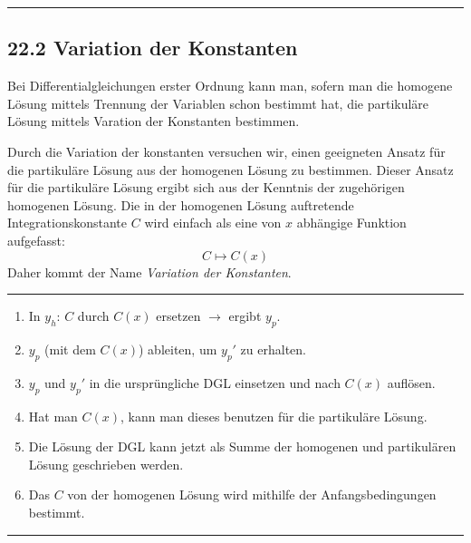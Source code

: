 \documentclass[a4paper,landscape,8pt]{extarticle}
\newcommand{\sep}{\vspace{5pt}\noindent\hrule\vspace{5pt}}
\begin{document}
\begin{multicols*}{4}
\sep

\subsection{22.2 Variation der Konstanten}

Bei Differentialgleichungen erster Ordnung kann man, sofern man die homogene
Lösung mittels Trennung der Variablen schon bestimmt hat, die partikuläre Lösung
mittels Varation der Konstanten bestimmen.

Durch die Variation der konstanten versuchen wir, einen geeigneten Ansatz für
die partikuläre Lösung aus der homogenen Lösung zu bestimmen. Dieser Ansatz für
die partikuläre Lösung ergibt sich aus der Kenntnis der zugehörigen homogenen
Lösung. Die in der homogenen Lösung auftretende Integrationskonstante $C$ wird
einfach als eine von $x$ abhängige Funktion aufgefasst:
\[
C \mapsto C(x)
\]
Daher kommt der Name \emph{Variation der Konstanten}. 

\sep

\Vorgehen 

\begin{enumerate}
  \item In $y_h$: $C$ durch $C(x)$ ersetzen $\to$ ergibt $y_p$.
  \item $y_p$ (mit dem $C(x)$) ableiten, um $y_p'$ zu erhalten.
  \item $y_p$ und $y_p'$ in die ursprüngliche DGL einsetzen und nach $C(x)$
  auflösen.
  \item Hat man $C(x)$, kann man dieses benutzen für die partikuläre Lösung.
  \item Die Lösung der DGL kann jetzt als Summe der homogenen und partikulären
  Lösung geschrieben werden.
  \item Das $C$ von der homogenen Lösung wird mithilfe der Anfangsbedingungen
  bestimmt.
\end{enumerate}

\sep


\end{multicols*}
\end{document}
